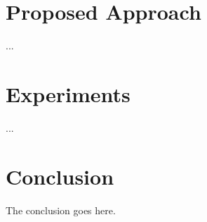 \documentclass{article}
\begin{document}
\section{Proposed Approach}

...

\section{Experiments}

...

\section{Conclusion}
The conclusion goes here.

\vfill\pagebreak


\end{document}
